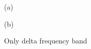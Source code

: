 \begin{figure}[h!]
\begin{minipage}[h]{0.49\linewidth}
 (a) \\
\end{minipage}
\hfill
\begin{minipage}[h]{0.5\linewidth}
 (b) \\
\end{minipage}
\caption{Only delta frequency band} 
\end{figure}

